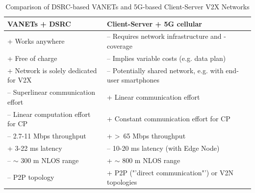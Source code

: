 \begin{table}[H]
	\begin{tabular}{|p{7.6cm}|p{7.6cm}|}
		\hline
		\textbf{VANETs + DSRC}                & \textbf{Client-Server + 5G cellular}                                                 \\ \hline
		\rowcolor[HTML]{9AFF99} 
		+ Works anywhere                      & \cellcolor[HTML]{FFCCC9}– Requires network infrastructure and -coverage              \\ \hline
		\rowcolor[HTML]{9AFF99} 
		+ Free of charge                      & \cellcolor[HTML]{FFCCC9}– Implies variable costs (e.g. data plan)                    \\ \hline
		\rowcolor[HTML]{9AFF99} 
		+ Network is solely dedicated for V2X & \cellcolor[HTML]{FFCCC9}– Potentially shared network, e.g. with end-user smartphones \\ \hline
		\rowcolor[HTML]{FFCCC9} 
		– Superlinear communication effort    & \cellcolor[HTML]{9AFF99}+ Linear communication effort                                \\ \hline
		\rowcolor[HTML]{FFCCC9} 
		– Linear computation effort for CP    & \cellcolor[HTML]{9AFF99}+ Constant communication effort for CP                       \\ \hline
		\rowcolor[HTML]{FFCCC9} 
		– 2.7-11 Mbps throughput \cite{Chen2016, Wang2013}              & \cellcolor[HTML]{9AFF99}+ \textgreater \ 65 Mbps throughput \cite{Kavanagh2019, wiki:5g}                          \\ \hline
		\rowcolor[HTML]{9AFF99} 
		+ 3-22 ms latency \cite{Rauch2011}                     & \cellcolor[HTML]{FFCCC9}– 10-20 ms latency (with Edge Node) \cite{wiki:5g, QualcommTechnologiesInc.2018}                          \\ \hline
		\rowcolor[HTML]{FFCCC9} 
		– $\sim$ 300 m NLOS range \cite{5GAutomotiveAssociation2018}              & \cellcolor[HTML]{9AFF99}+ $\sim$ 800 m NLOS range \cite{5GAutomotiveAssociation2018}                                     \\ \hline
		\rowcolor[HTML]{FFCCC9} 
		– P2P topology                        & \cellcolor[HTML]{9AFF99}+ P2P ("'direct communication"') or V2N topologies             \\ \hline            
	\end{tabular}
	\caption{Comparison of DSRC-based VANETs and 5G-based Client-Server V2X Networks}
	\label{tab:5g_dsrc_comparison}
\end{table}

